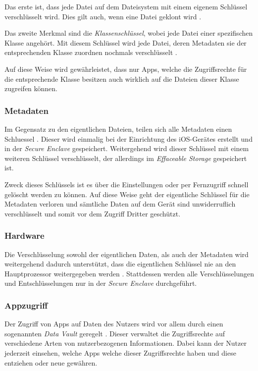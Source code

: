 Das erste ist, dass jede Datei auf dem Dateisystem mit einem eigenem Schlüssel
verschlüsselt wird. Dies gilt auch, wenn eine Datei geklont wird \cite[S.
49]{apple2020}.

Das zweite Merkmal sind die \textit{Klassenschlüssel}, wobei jede Datei einer
spezifischen Klasse angehört. Mit diesem Schlüssel wird jede Datei, deren
Metadaten sie der entsprechenden Klasse zuordnen nochmals verschlüsselt \cite[S.
49]{apple2020}.

Auf diese Weise wird gewährleistet, dass nur Apps, welche die Zugriffsrechte für
die entsprechende Klasse besitzen auch wirklich auf die Dateien dieser Klasse
zugreifen können.

\subsubsection{Metadaten}
Im Gegensatz zu den eigentlichen Dateien, teilen sich alle Metadaten einen
Schluessel \cite[S. 50]{apple2020}. Dieser wird einmalig bei der Einrichtung des
iOS-Gerätes erstellt und in der \textit{Secure Enclave} gespeichert.
Weitergehend wird dieser Schlüssel mit einem weiteren Schlüssel verschlüsselt,
der allerdings im \textit{Effaceable Storage} gespeichert ist.

Zweck dieses Schlüssels ist es über die Einstellungen oder per Fernzugriff
schnell gelöscht werden zu können. Auf diese Weise geht der eigentliche
Schlüssel für die Metadaten verloren und sämtliche Daten auf dem Gerät sind
unwiderruflich verschlüsselt und somit vor dem Zugriff Dritter geschützt.

\subsubsection{Hardware}
Die Verschlüsselung sowohl der eigentlichen Daten, als auch der Metadaten wird
weitergehend dadurch unterstützt, dass die eigentlichen Schlüssel nie an den
Hauptprozessor weitergegeben werden \cite[S. 50]{apple2020}. Stattdessen werden
alle Verschlüsselungen und Entschlüsselungen nur in der \textit{Secure Enclave}
durchgeführt.

\subsubsection{Appzugriff}
Der Zugriff von Apps auf Daten des Nutzers wird vor allem durch einen
sogenannten \textit{Data Vault} geregelt \cite[S. 47]{apple2020}. Dieser
verwaltet die Zugriffsrechte auf verschiedene Arten von nutzerbezogenen
Informationen. Dabei kann der Nutzer jederzeit einsehen, welche Apps welche
dieser Zugriffsrechte haben und diese entziehen oder neue gewähren.

